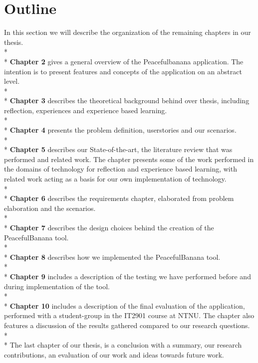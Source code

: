 \section{Outline}
In this section we will describe the organization of the remaining chapters in our thesis. 
\\*
\\*
\textbf{Chapter 2} gives a general overview of the Peacefulbanana application. The intention is to present features and concepts of the application on an abstract level.
\\*
\\*
\textbf{Chapter 3} describes the theoretical background behind over thesis, including reflection, experiences and experience based learning. 
\\*
\\*
\textbf{Chapter 4} presents the problem definition, userstories and our scenarios. 
\\*
\\*
\textbf{Chapter 5} describes our State-of-the-art, the literature review that was performed and related work. The chapter presents some of the work performed in the domains of technology for reflection and experience based learning, with related work acting as a basis for our own implementation of technology. 
\\*
\\*
\textbf{Chapter 6} describes the requirements chapter, elaborated from problem elaboration and the scenarios. 
\\*
\\*
\textbf{Chapter 7} describes the design choices behind the creation of the PeacefulBanana tool.
\\*
\\*
\textbf{Chapter 8} describes how we implemented the PeacefulBanana tool. 
\\*
\\*
\textbf{Chapter 9} includes a description of the testing we have performed before and during implementation of the tool. 
\\*
\\*
\textbf{Chapter 10} includes a description of the final evaluation of the application, performed with a student-group in the IT2901 course at NTNU. The chapter also features a discussion of the results gathered compared to our research questions. 
\\*
\\*
The last chapter of our thesis, is a conclusion with a summary, our research contributions, an evaluation of our work and ideas towards future work.